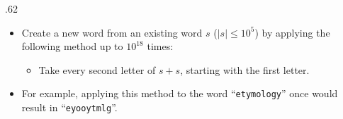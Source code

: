 \begin{frame}
    \frametitle{\problemtitle}

    \begin{columns}
        \begin{column}[T]{.62\textwidth}
            \begin{itemize}
                \item Create a new word from an existing word $s$ ($|s| \leq 10^5$)
                by applying the following method up to $10^{18}$ times:
                \begin{itemize}
                    \normalsize
                    \item Take every second letter of $s+s$, starting with the first letter.
                \end{itemize}
                \item For example, applying this method to the word ``\texttt{etymology}'' once
                    would result in ``\texttt{eyooytmlg}''.
            \end{itemize}



        \end{column}

    \end{columns}
\end{frame}
